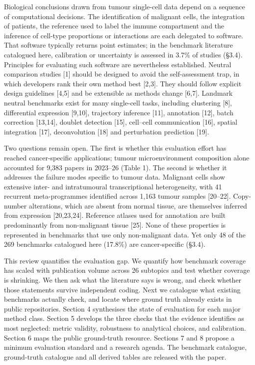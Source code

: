 \documentclass{article}
\begin{document}
Biological conclusions drawn from tumour single-cell data depend on a
sequence of computational decisions. The identification of malignant
cells, the integration of patients, the reference used to label the
immune compartment and the inference of cell-type proportions or
interactions are each delegated to software. That software typically
returns point estimates; in the benchmark literature catalogued here,
calibration or uncertainty is assessed in 3.7\% of studies (§3.4).
Principles for evaluating such software are nevertheless established.
Neutral comparison studies {[}1{]} should be designed to avoid the
self-assessment trap, in which developers rank their own method best
{[}2,3{]}. They should follow explicit design guidelines {[}4,5{]} and
be extensible as methods change {[}6,7{]}. Landmark neutral benchmarks
exist for many single-cell tasks, including clustering {[}8{]},
differential expression {[}9,10{]}, trajectory inference {[}11{]},
annotation {[}12{]}, batch correction {[}13,14{]}, doublet detection
{[}15{]}, cell--cell communication {[}16{]}, spatial integration
{[}17{]}, deconvolution {[}18{]} and perturbation prediction {[}19{]}.

Two questions remain open. The first is whether this evaluation effort
has reached cancer-specific applications; tumour microenvironment
composition alone accounted for 9,383 papers in 2023--26 (Table 1). The
second is whether it addresses the failure modes specific to tumour
data. Malignant cells show extensive inter- and intratumoural
transcriptional heterogeneity, with 41 recurrent meta-programmes
identified across 1,163 tumour samples {[}20--22{]}. Copy-number
alterations, which are absent from normal tissue, are themselves
inferred from expression {[}20,23,24{]}. Reference atlases used for
annotation are built predominantly from non-malignant tissue {[}25{]}.
None of these properties is represented in benchmarks that use only
non-malignant data. Yet only 48 of the 269 benchmarks catalogued here
(17.8\%) are cancer-specific (§3.4).

This review quantifies the evaluation gap. We quantify how benchmark
coverage has scaled with publication volume across 26 subtopics and test
whether coverage is shrinking. We then ask what the literature says is
wrong, and check whether those statements survive independent coding.
Next we catalogue what existing benchmarks actually check, and locate
where ground truth already exists in public repositories. Section 4
synthesises the state of evaluation for each major method class. Section
5 develops the three checks that the evidence identifies as most
neglected: metric validity, robustness to analytical choices, and
calibration. Section 6 maps the public ground-truth resource. Sections 7
and 8 propose a minimum evaluation standard and a research agenda. The
benchmark catalogue, ground-truth catalogue and all derived tables are
released with the paper.
\end{document}
